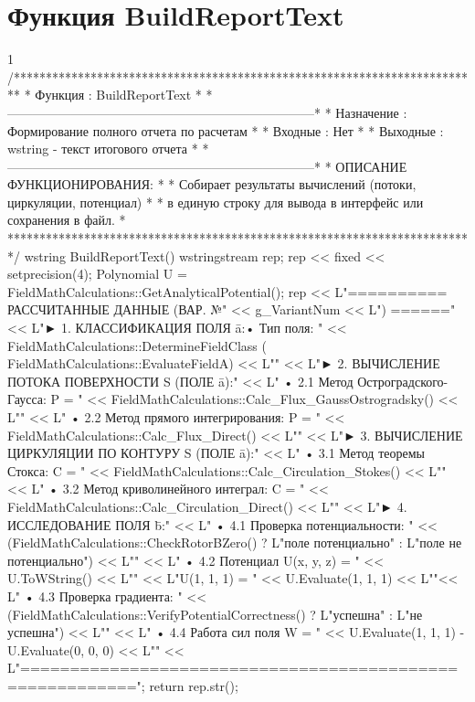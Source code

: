\section{Функция BuildReportText}
\footnotesize
\begin{listing}{1}
/*************************************************************************
* Функция       : BuildReportText                                        *
*------------------------------------------------------------------------*
* Назначение    : Формирование полного отчета по расчетам                *
* Входные       : Нет                                                    *
* Выходные      : wstring - текст итогового отчета                       *
*------------------------------------------------------------------------*
* ОПИСАНИЕ ФУНКЦИОНИРОВАНИЯ:                                             *
* Собирает результаты вычислений (потоки, циркуляции, потенциал)          *
* в единую строку для вывода в интерфейс или сохранения в файл.          *
*************************************************************************/
wstring BuildReportText() { wstringstream rep; rep << fixed << setprecision(4); 
    Polynomial U = FieldMathCalculations::GetAnalyticalPotential();
    rep << L"========== РАССЧИТАННЫЕ ДАННЫЕ (ВАР. №" << g_VariantNum << L") ======\n\n"
        << L"► 1. КЛАССИФИКАЦИЯ ПОЛЯ ā:\n   • Тип поля: " 
        << FieldMathCalculations::DetermineFieldClass
	( FieldMathCalculations::EvaluateFieldA) << L"\n\n"
        << L"► 2. ВЫЧИСЛЕНИЕ ПОТОКА ПОВЕРХНОСТИ S (ПОЛЕ ā):\n"
        << L"   • 2.1 Метод Остроградского-Гаусса: P = " 
        << FieldMathCalculations::Calc_Flux_GaussOstrogradsky() << L"\n"
        << L"   • 2.2 Метод прямого интегрирования: P = " 
        << FieldMathCalculations::Calc_Flux_Direct() << L"\n\n"
        << L"► 3. ВЫЧИСЛЕНИЕ ЦИРКУЛЯЦИИ ПО КОНТУРУ S (ПОЛЕ ā):\n"
        << L"   • 3.1 Метод теоремы Стокса: C = " 
        << FieldMathCalculations::Calc_Circulation_Stokes() << L"\n"
        << L"   • 3.2 Метод криволинейного интеграл: C = " 
        << FieldMathCalculations::Calc_Circulation_Direct() << L"\n\n"
        << L"► 4. ИССЛЕДОВАНИЕ ПОЛЯ b̄:\n" << L"   • 4.1 Проверка потенциальности: " 
        << (FieldMathCalculations::CheckRotorBZero() ? 
            L"поле потенциально" : L"поле не потенциально") << L"\n"
        << L"   • 4.2 Потенциал U(x, y, z) = " << U.ToWString() << L"\n"
        << L"U(1, 1, 1) = " << U.Evaluate(1, 1, 1) << L"\n"<< L" • 4.3 Проверка градиента: " 
        << (FieldMathCalculations::VerifyPotentialCorrectness() ? 
            L"успешна" : L"не успешна") << L"\n" << L"   • 4.4 Работа сил поля W = " 
        << U.Evaluate(1, 1, 1) - U.Evaluate(0, 0, 0) << L"\n\n"
        << L"========================================================="; return rep.str(); }
\end{listing}
\normalsize

